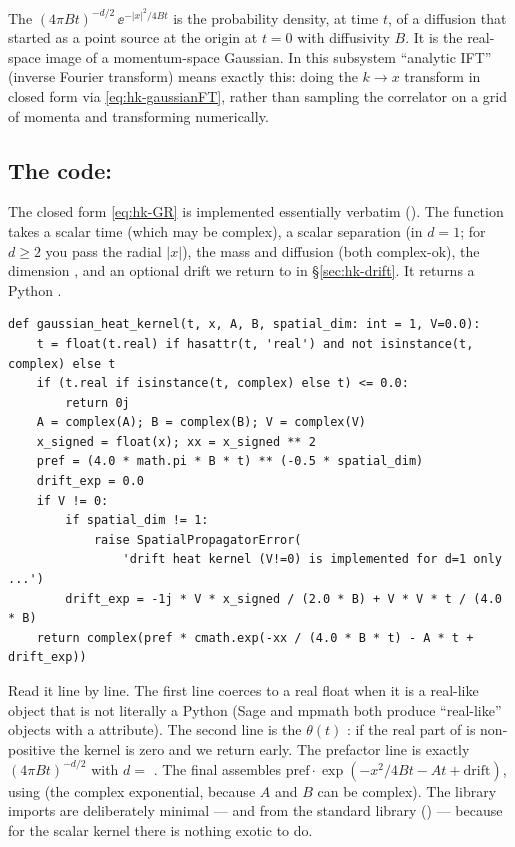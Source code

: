 \begin{defn}
The  $(4\pi B t)^{-d/2}\,\ee^{-|x|^{2}/4Bt}$ is the
probability density, at time $t$, of a diffusion that started as a point source
at the origin at $t=0$ with diffusivity $B$. It is the real-space image of a
momentum-space Gaussian. In this subsystem ``analytic IFT'' (inverse Fourier
transform) means exactly this: doing the $k\to x$ transform in closed form via
\eqref{eq:hk-gaussianFT}, rather than sampling the correlator on a grid of
momenta and transforming numerically.
\end{defn}

\subsection{The code: }

The closed form \eqref{eq:hk-GR} is implemented essentially verbatim
(). The function takes a scalar time  (which
may be complex), a scalar separation  (in $d=1$; for $d\ge 2$ you pass
the radial $|x|$), the mass  and diffusion  (both complex-ok),
the dimension , and an optional drift  we return to
in \S\ref{sec:hk-drift}. It returns a Python .

\begin{lstlisting}
def gaussian_heat_kernel(t, x, A, B, spatial_dim: int = 1, V=0.0):
    t = float(t.real) if hasattr(t, 'real') and not isinstance(t, complex) else t
    if (t.real if isinstance(t, complex) else t) <= 0.0:
        return 0j
    A = complex(A); B = complex(B); V = complex(V)
    x_signed = float(x); xx = x_signed ** 2
    pref = (4.0 * math.pi * B * t) ** (-0.5 * spatial_dim)
    drift_exp = 0.0
    if V != 0:
        if spatial_dim != 1:
            raise SpatialPropagatorError(
                'drift heat kernel (V!=0) is implemented for d=1 only ...')
        drift_exp = -1j * V * x_signed / (2.0 * B) + V * V * t / (4.0 * B)
    return complex(pref * cmath.exp(-xx / (4.0 * B * t) - A * t + drift_exp))
\end{lstlisting}

Read it line by line. The first line coerces  to a real float when it
is a real-like object that is not literally a Python  (Sage and
mpmath both produce ``real-like'' objects with a  attribute). The
second line is the $\theta(t)$ : if the real part of
 is non-positive the kernel is zero and we return early. The prefactor
line is exactly $(4\pi B t)^{-d/2}$ with $d=$ . The final
 assembles $\text{pref}\cdot\exp(-x^{2}/4Bt - A t + \text{drift})$,
using  (the complex exponential, because $A$ and $B$ can be
complex). The library imports are deliberately minimal ---  and
 from the standard library () ---
because for the scalar kernel there is nothing exotic to do.

